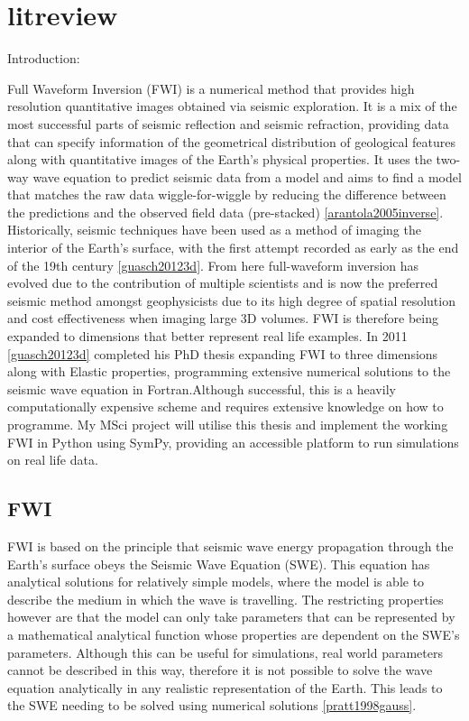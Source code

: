 \chapter{litreview}
\label{litreview}

Introduction: 

Full Waveform Inversion (FWI) is a numerical method that provides high resolution quantitative images obtained via seismic exploration. It is a mix of the most successful parts of seismic reflection and seismic refraction, providing data that can specify information of the geometrical distribution of geological features along with quantitative images of the Earth's physical properties. 
It uses the two-way wave equation to predict seismic data from a model and aims to find a model that matches the raw data wiggle-for-wiggle by reducing the difference between the predictions and the observed field data (pre-stacked) \ref{arantola2005inverse}. 
\\ 
Historically, seismic techniques have been used as a method of imaging the interior of the Earth's surface, with the first attempt recorded as early as the end of the 19th century \ref{guasch20123d}. From here full-waveform inversion has evolved due to the contribution of multiple scientists and is now the preferred seismic method amongst geophysicists due to its high degree of spatial resolution and cost effectiveness when imaging large 3D volumes. FWI is therefore being expanded to dimensions that better represent real life examples. In 2011 \ref{guasch20123d} completed his PhD thesis expanding FWI to three dimensions along with Elastic properties, programming extensive numerical solutions to the seismic wave equation in Fortran.Although successful, this is a heavily computationally expensive scheme and requires extensive knowledge on how to programme. My MSci project will utilise this thesis and implement the working FWI in Python using SymPy, providing an accessible platform to run simulations on real life data.   


\section{FWI} 
FWI is based on the principle that seismic wave energy propagation through the Earth’s surface obeys the Seismic Wave Equation (SWE). This equation has analytical solutions for relatively simple models, where the model is able to describe the medium in which the wave is travelling. The restricting properties however are that the model can only take parameters that can be represented by a mathematical analytical function whose properties are dependent on the SWE's parameters. Although this can be useful for simulations, real world parameters cannot be described in this way, therefore it is not possible to solve the wave equation analytically in any realistic representation of the Earth. This leads to the SWE needing to be solved using numerical solutions \ref{pratt1998gauss}. 

